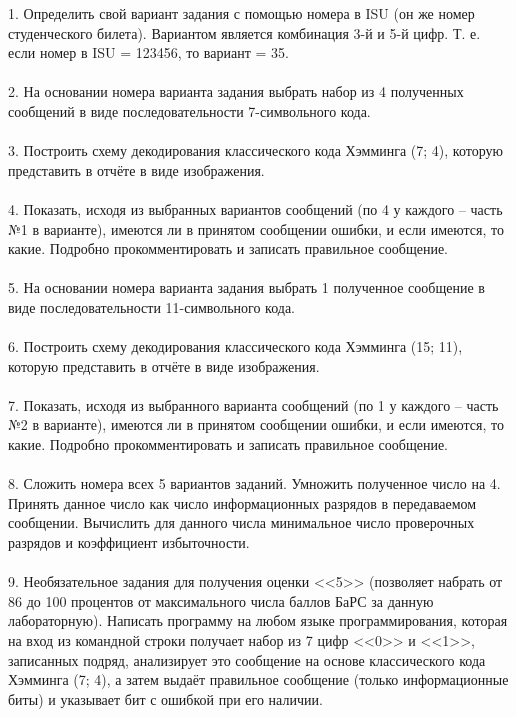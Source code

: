 \documentclass[12pt]{article}
\begin{document}
1. Определить свой вариант задания с помощью номера в ISU (он же номер
студенческого билета). Вариантом является комбинация 3-й и 5-й цифр.
Т. е. если номер в ISU = 123456, то вариант = 35.\\
\\
2. На основании номера варианта задания выбрать набор из 4 полученных
сообщений в виде последовательности 7-символьного кода.\\
\\
3. Построить схему декодирования классического кода Хэмминга (7; 4),
которую представить в отчёте в виде изображения.\\
\\
4. Показать, исходя из выбранных вариантов сообщений (по 4 у каждого –
часть №1 в варианте), имеются ли в принятом сообщении ошибки, и если
имеются, то какие. Подробно прокомментировать и записать правильное
сообщение.\\
\\
5. На основании номера варианта задания выбрать 1 полученное сообщение в
виде последовательности 11-символьного кода.\\
\\
6. Построить схему декодирования классического кода Хэмминга (15; 11),
которую представить в отчёте в виде изображения.\\
\\
7. Показать, исходя из выбранного варианта сообщений (по 1 у каждого –
часть №2 в варианте), имеются ли в принятом сообщении ошибки, и если
имеются, то какие. Подробно прокомментировать и записать правильное
сообщение.\\
\\
8. Сложить номера всех 5 вариантов заданий. Умножить полученное число
на 4. Принять данное число как число информационных разрядов в
передаваемом сообщении. Вычислить для данного числа минимальное
число проверочных разрядов и коэффициент избыточности.\\
\\
9. Необязательное задания для получения оценки <<5>> (позволяет набрать от
86 до 100 процентов от максимального числа баллов БаРС за данную
лабораторную). Написать программу на любом языке программирования,
которая на вход из командной строки получает набор из 7 цифр <<0>> и <<1>>,
записанных подряд, анализирует это сообщение на основе классического
кода Хэмминга (7; 4), а затем выдаёт правильное сообщение (только
информационные биты) и указывает бит с ошибкой при его наличии.

\newpage
\end{document}
